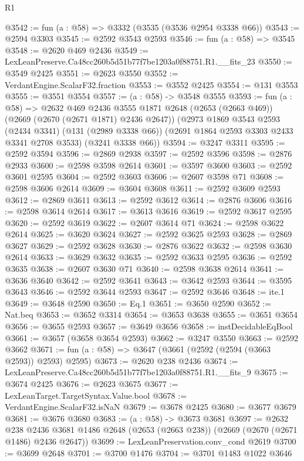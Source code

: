 \begin{lexlean}{R1}
\begin{coremodule}
@3542 := fun (a : @58) => @3332 (@3535 (@3536 @2954 @3338 @66))
@3543 := @2594 @3303
@3545 := @2592 @3543 @2593
@3546 := fun (a : @58) => @3545
@3548 := @2620 @469 @2436
@3549 := LexLeanPreserve.Ca48cc260b5d51b77f7be1203a0f88751.R1.__fits_23
@3550 := @3549 @2425
@3551 := @2623 @3550
@3552 := VerdantEngine.ScalarF32.fraction
@3553 := @3552 @2425
@3554 := @131 @3553
@3555 := @3551 @3554
@3557 := (a : @58) -> @3548 @3555
@3593 := fun (a : @58) =>
  @2632
    @469
    @2436
    @3555
    @1871
    @2648
    (@2653 (@2663 @469))
    (@2669 (@2670 (@2671 @1871) @2436 @2647))
    (@2973
      @1869
      @3543
      @2593
      (@2434 @3341)
      (@131 (@2989 @3338 @66))
      (@2691 @1864 @2593 @3303 @2433 @3341 @2708 @3533)
      (@3241 @3338 @66))
@3594 := @3247 @3311
@3595 := @2592 @3594
@3596 := @2869 @2938
@3597 := @2592 @3596
@3598 := @2876 @2933
@3600 := @2598 @3598 @2614
@3601 := @3597 @3600
@3603 := @2592 @3601 @2595
@3604 := @2592 @3603
@3606 := @2607 @3598 @71
@3608 := @2598 @3606 @2614
@3609 := @3604 @3608
@3611 := @2592 @3609 @2593
@3612 := @2869 @3611
@3613 := @2592 @3612
@3614 := @2876 @3606
@3616 := @2598 @3614 @2614
@3617 := @3613 @3616
@3619 := @2592 @3617 @2595
@3620 := @2592 @3619
@3622 := @2607 @3614 @71
@3624 := @2598 @3622 @2614
@3625 := @3620 @3624
@3627 := @2592 @3625 @2593
@3628 := @2869 @3627
@3629 := @2592 @3628
@3630 := @2876 @3622
@3632 := @2598 @3630 @2614
@3633 := @3629 @3632
@3635 := @2592 @3633 @2595
@3636 := @2592 @3635
@3638 := @2607 @3630 @71
@3640 := @2598 @3638 @2614
@3641 := @3636 @3640
@3642 := @2592 @3641
@3643 := @3642 @2593
@3644 := @3595 @3643
@3646 := @2592 @3644 @2593
@3647 := @2592 @3646
@3648 := ite.{1}
@3649 := @3648 @2590
@3650 := Eq.{1}
@3651 := @3650 @2590
@3652 := Nat.beq
@3653 := @3652 @3314
@3654 := @3653 @3638
@3655 := @3651 @3654
@3656 := @3655 @2593
@3657 := @3649 @3656
@3658 := instDecidableEqBool
@3661 := @3657 (@3658 @3654 @2593)
@3662 := @3247 @3550
@3663 := @2592 @3662
@3671 := fun (a : @58) => @3647 (@3661 (@2592 (@2594 (@3663 @2593)) @2593) @2595)
@3673 := @2620 @238 @2436
@3674 := LexLeanPreserve.Ca48cc260b5d51b77f7be1203a0f88751.R1.__fits_9
@3675 := @3674 @2425
@3676 := @2623 @3675
@3677 := LexLeanTarget.TargetSyntax.Value.bool
@3678 := VerdantEngine.ScalarF32.isNaN
@3679 := @3678 @2425
@3680 := @3677 @3679
@3681 := @3676 @3680
@3683 := (a : @58) -> @3673 @3681
@3697 := @2632
    @238
    @2436
    @3681
    @1486
    @2648
    (@2653 (@2663 @238))
    (@2669 (@2670 (@2671 @1486) @2436 @2647))
@3699 := LexLeanPreservation.conv_cond @2619
@3700 := @3699 @2648
@3701 := @3700 @1476
@3704 := @3701 @1483 @1022 @3646

\end{coremodule}
\end{lexlean}
